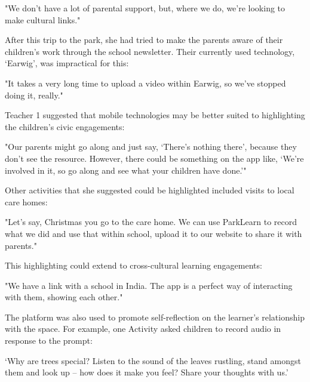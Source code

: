 \begin{displayquote}
"We don’t have a lot of parental support, but, where we do, we’re looking to make cultural links."
\end{displayquote}

After this trip to the park, she had tried to make the parents aware of their children’s work through the school newsletter. Their currently used technology, `Earwig', was impractical for this:

\begin{displayquote}
"It takes a very long time to upload a video within Earwig, so we've stopped doing it, really."
\end{displayquote}

Teacher 1 suggested that mobile technologies may be better suited to highlighting the children’s civic engagements: 

\begin{displayquote}
"Our parents might go along and just say, `There's nothing there', because they don’t see the resource. However, there could be something on the app like, `We're involved in it, so go along and see what your children have done.'" 
\end{displayquote}

Other activities that she suggested could be highlighted included visits to local care homes: 

\begin{displayquote}
"Let’s say, Christmas you go to the care home. We can use ParkLearn to record what we did and use that within school, upload it to our website to share it with parents."
\end{displayquote}

This highlighting could extend to cross-cultural learning engagements: 

\begin{displayquote}
"We have a link with a school in India. The app is a perfect way of interacting with them, showing each other."
\end{displayquote}

The platform was also used to promote self-reflection on the learner’s relationship with the space. For example, one Activity asked children to record audio in response to the prompt:

\begin{displayquote}
`Why are trees special? Listen to the sound of the leaves rustling, stand amongst them and look up – how does it make you feel? Share your thoughts with us.' 
\end{displayquote}

